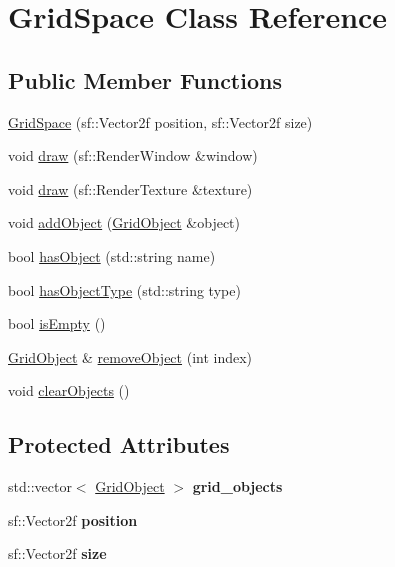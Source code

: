 \hypertarget{classGridSpace}{}\section{Grid\+Space Class Reference}
\label{classGridSpace}
\subsection*{Public Member Functions}
\begin{DoxyCompactItemize}
\item 
\hyperlink{classGridSpace_ae6fdb7de4f757789ae1dbca55445779c}{Grid\+Space} (sf\+::\+Vector2f position, sf\+::\+Vector2f size)
\item 
void \hyperlink{classGridSpace_a5c075b8354b80be59475211edb92d48b}{draw} (sf\+::\+Render\+Window \&window)
\item 
void \hyperlink{classGridSpace_a84e4bb348f957ca3e6542cd2a333177c}{draw} (sf\+::\+Render\+Texture \&texture)
\item 
void \hyperlink{classGridSpace_a500df3fbf7fdf8869fd562412233a039}{add\+Object} (\hyperlink{classGridObject}{Grid\+Object} \&object)
\item 
bool \hyperlink{classGridSpace_ace70eaf9c70d0013480543289e5ea6d0}{has\+Object} (std\+::string name)
\item 
bool \hyperlink{classGridSpace_a9721f3981d83c2f9e97635d7ea2c6699}{has\+Object\+Type} (std\+::string type)
\item 
bool \hyperlink{classGridSpace_a9a1b3e207bbb537340f4a2dd1492796e}{is\+Empty} ()
\item 
\hyperlink{classGridObject}{Grid\+Object} \& \hyperlink{classGridSpace_a594a21f7ad73da6c21ba5a258884b910}{remove\+Object} (int index)
\item 
void \hyperlink{classGridSpace_afe6e2ac48c9643732639f0ab2be5e997}{clear\+Objects} ()
\end{DoxyCompactItemize}
\subsection*{Protected Attributes}
\begin{DoxyCompactItemize}
\item 
\mbox{\label{classGridSpace_aa3a7956894bb14f43f92a3c747155ddc}} 
std\+::vector$<$ \hyperlink{classGridObject}{Grid\+Object} $>$ {\bfseries grid\+\_\+objects}
\item 
\mbox{\label{classGridSpace_a07f987ee4822be5ebb283c3a7d03ff31}} 
sf\+::\+Vector2f {\bfseries position}
\item 
\mbox{\label{classGridSpace_a4eaa6c844d9885fe9e96bfebd846e698}} 
sf\+::\+Vector2f {\bfseries size}
\end{DoxyCompactItemize}


